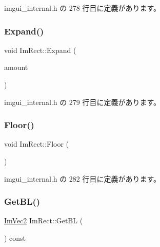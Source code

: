  imgui\+\_\+internal.\+h の 278 行目に定義があります。

\mbox{\label{struct_im_rect_ac0b0b88fe65725b4694cd7d91d42d382}} 
\subsubsection{\texorpdfstring{Expand()}{Expand()}\hspace{0.1cm}{\footnotesize\ttfamily [2/2]}}
{\footnotesize\ttfamily void Im\+Rect\+::\+Expand (\begin{DoxyParamCaption}\item[{const \mbox{\hyperlink{struct_im_vec2}{Im\+Vec2}} \&}]{amount }\end{DoxyParamCaption})\hspace{0.3cm}{\ttfamily [inline]}}



 imgui\+\_\+internal.\+h の 279 行目に定義があります。

\mbox{\label{struct_im_rect_a8fdf75a0c64ff29f65113cd9f8be77ab}} 
\subsubsection{\texorpdfstring{Floor()}{Floor()}}
{\footnotesize\ttfamily void Im\+Rect\+::\+Floor (\begin{DoxyParamCaption}{ }\end{DoxyParamCaption})\hspace{0.3cm}{\ttfamily [inline]}}



 imgui\+\_\+internal.\+h の 282 行目に定義があります。

\mbox{\label{struct_im_rect_a59d9751bc7be6745dddf5b83b9155669}} 
\subsubsection{\texorpdfstring{Get\+B\+L()}{GetBL()}}
{\footnotesize\ttfamily \mbox{\hyperlink{struct_im_vec2}{Im\+Vec2}} Im\+Rect\+::\+Get\+BL (\begin{DoxyParamCaption}{ }\end{DoxyParamCaption}) const\hspace{0.3cm}{\ttfamily [inline]}}



